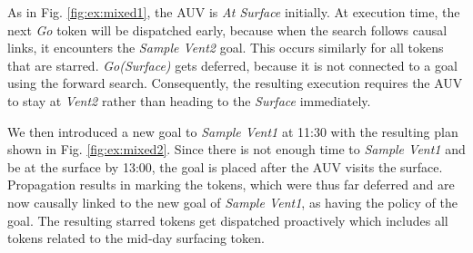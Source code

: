 As in Fig. \ref{fig:ex:mixed1}, the AUV is {\em At Surface} initially.
At execution time, the next {\em Go} token will be dispatched
early, because when the search follows causal links, it
encounters the {\em Sample Vent2} goal.  This occurs similarly
for all tokens that are starred. {\em Go(Surface)} gets deferred,
because it is not connected to a goal using the forward
search. Consequently, the resulting execution requires the AUV to stay at {\em
  Vent2} rather than heading to the {\em Surface} immediately.


We then introduced a new goal to {\em Sample Vent1} at
11:30 with the resulting plan shown in Fig. \ref{fig:ex:mixed2}. Since
there is not enough time to {\em Sample Vent1} and be at the surface
by 13:00, the goal is placed after the AUV visits the
surface. Propagation results in marking the tokens, which were thus
far deferred and are now causally linked to the new
goal of {\em Sample Vent1}, as having the policy of the goal. The
resulting starred tokens get dispatched proactively which includes all
tokens related to the mid-day surfacing token.

